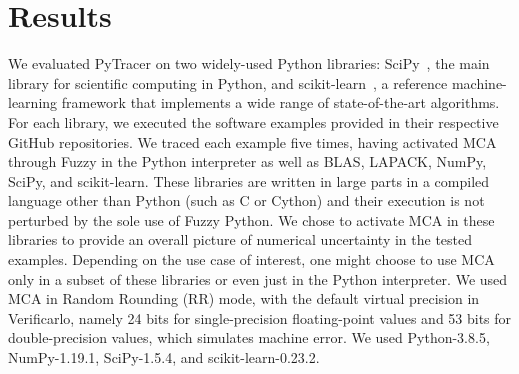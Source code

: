 \documentclass[10pt,journal,compsoc]{IEEEtran}
\newcommand{\pytracer}[0]{PyTracer\xspace}
\begin{document}
\section{Results}

We evaluated \pytracer on two widely-used Python libraries:
SciPy~\cite{virtanen2020scipy}, the main library for scientific computing in
Python, and  scikit-learn~\cite{pedregosa2011scikit}, a reference
machine-learning framework that implements a wide range of state-of-the-art
algorithms. For each library, we executed the software examples provided in
their respective GitHub repositories. We traced each example five times, having
activated MCA through Fuzzy in the Python interpreter as well as BLAS, LAPACK, NumPy,
SciPy, and scikit-learn. These libraries are written in large parts in a
compiled language other than Python (such as C or Cython) and their execution is not 
perturbed by the sole use of Fuzzy Python. We chose to activate MCA in these libraries 
to provide an overall picture of numerical uncertainty in the tested examples. 
Depending on the use case of interest, one might choose to use MCA only in 
a subset of these libraries or even just in the Python interpreter. We
used MCA in Random Rounding (RR) mode, with the default virtual
precision in Verificarlo, namely 24 bits for single-precision floating-point
values and 53 bits for double-precision values, which simulates machine error.
We used Python-3.8.5, NumPy-1.19.1, SciPy-1.5.4, and scikit-learn-0.23.2.
\end{document}
